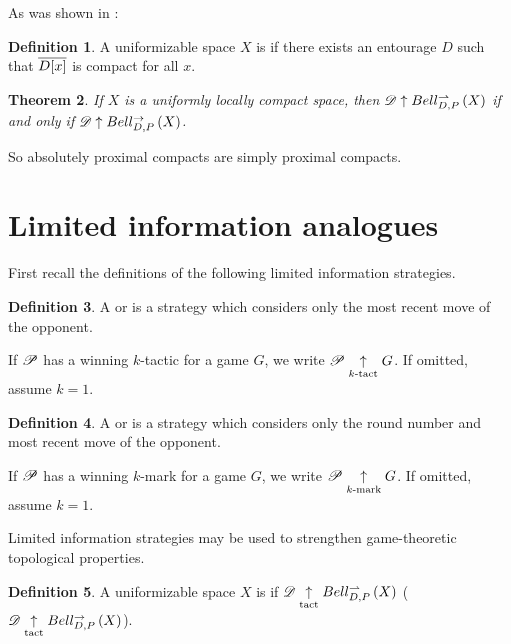 \documentclass{amsart}
\newtheorem{theorem}{Theorem}[section]
\theoremstyle{definition}
\newtheorem{definition}[theorem]{Definition}
\begin{document}
  As was shown in \cite{MR3227201}:

  \begin{definition}
    A uniformizable space \(X\) is  if there
    exists an entourage \(D\) such that \(\overline{D[x]}\) is compact
    for all \(x\).
  \end{definition}

  \begin{theorem}\label{uniformlyLocallyCompact}
    If \(X\) is a uniformly locally compact space, then
    \(\mathscr{D} \uparrow Bell_{D,P}^{\rightharpoonup}\left({X}\right)\) if and only if
    \(\mathscr{D} \uparrow Bell_{D,P}^{\to}\left({X}\right)\).
  \end{theorem}

  So absolutely proximal compacts are simply proximal compacts.


\section{Limited information analogues}

  First recall the definitions of the following limited information strategies.

  \begin{definition}
    A  or 
    is a strategy which considers only the most recent move of the opponent.

    If \(\mathscr{P}\) has a winning \(k\)-tactic for a game \(G\), we write
    \(\mathscr{P}\underset{k\text{-tact}}{\uparrow} G\). If omitted, assume \(k=1\).
  \end{definition}

  \begin{definition}
    A  or  is a strategy
    which considers only the round number and most recent move of the
    opponent.

    If \(\mathscr{P}\) has a winning \(k\)-mark for a game \(G\), we write
    \(\mathscr{P}\underset{k\text{-mark}}{\uparrow} G\). If omitted, assume \(k=1\).
  \end{definition}

  Limited information strategies may be used to strengthen game-theoretic
  topological properties.

  \begin{definition}
    A uniformizable space \(X\) is  if
    \(\mathscr{D} \underset{\text{tact}}{\uparrow} Bell_{D,P}^{\rightharpoonup}\left({X}\right)\) (\(\mathscr{D} \underset{\text{tact}}{\uparrow} Bell_{D,P}^{\to}\left({X}\right)\)).
  \end{definition}
\end{document}
